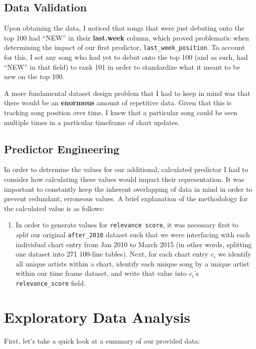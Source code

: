 \documentclass[11pt]{article} %
\begin{document}
\subsection*{Data Validation}
Upon obtaining the data, I noticed that songs that were just debuting onto the top 100 had ``NEW'' in their \textbf{last.week} column, which proved problematic when determining the impact of our first predictor, \texttt{last\_week\_position}. To account for this, I set any song who had yet to debut onto the top 100 (and as such, had ``NEW'' in that field) to rank 101 in order to standardize what it meant to be new on the top 100. \par

A more fundamental dataset design problem that I had to keep in mind was that there would be an \textbf{enormous} amount of repetitive data. Given that this is tracking song position over time, I knew that a particular song could be seen multiple times in a particular timeframe of chart updates. \par

\subsection*{Predictor Engineering}
In order to determine the values for our additional, calculated predictor I had to consider how calculating these values would impact their representation. It was important to constantly keep the inherent overlapping of data in mind in order to prevent redundant, erroneous values. A brief explanation of the methodology for the calculated value is as follows:\par

\begin{enumerate}
	\item In order to generate values for \texttt{relevance score}, it was necessary first to \textit{split} our original \texttt{after\_2010} dataset such that we were interfacing with each individual chart entry from Jan 2010 to March 2015 (in other words, splitting one dataset into 271 100-line tables). Next, for each chart entry $c_{i}$ we identify all unique artists within a chart, identify each unique song by a unique artist within our time frame dataset, and write that value into $c_{i}$'s \texttt{relevance\_score} field.
\end{enumerate}

\section*{Exploratory Data Analysis}
First, let's take a quick look at a summary of our provided data:
\end{document}
